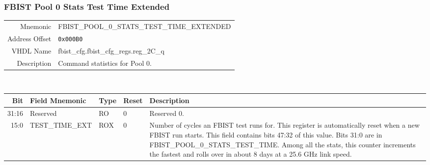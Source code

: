 \subsubsection{FBIST Pool 0 Stats Test Time Extended}
\begin{tabular}{ r | p{350px} }
  Mnemonic       & FBIST\_POOL\_0\_STATS\_TEST\_TIME\_EXTENDED \\
  Address Offset & \texttt{0x000B0}                            \\
  VHDL Name      &  fbist\_cfg.fbist\_cfg\_regs.reg\_2C\_q     \\ \hline

  Description &
  Command statistics for Pool 0. \\
\end{tabular}
\\
\begin{tabularx}{\textwidth}{r|l|l|l|X}
  \hline
  Bit   & Field Mnemonic  & Type & Reset & Description \\ \hline

  31:16 & Reserved        & RO   & 0     &

  Reserved 0. \\

  15:0  & TEST\_TIME\_EXT & ROX  & 0     &

  Number of cycles an FBIST test runs for. This register is
  automatically reset when a new FBIST run starts. This field contains
  bits 47:32 of this value. Bits 31:0 are in
  FBIST\_POOL\_0\_STATS\_TEST\_TIME. Among all the stats, this counter
  increments the fastest and rolls over in about 8 days at a 25.6 GHz
  link speed. \\
\end{tabularx}

